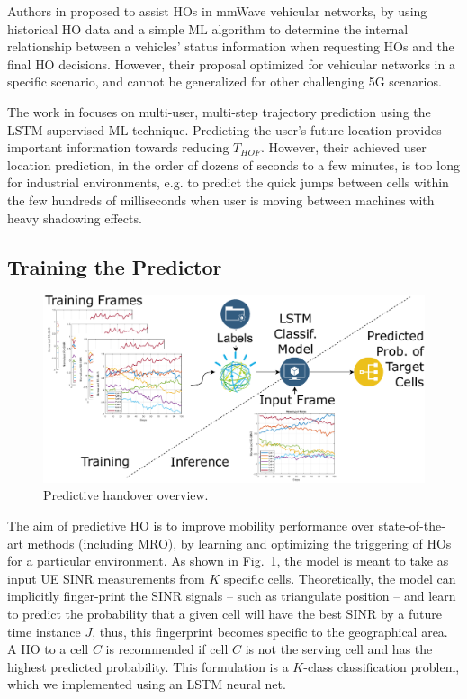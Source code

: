 			Authors in \cite{mlbasedho} proposed to assist \acp{HO} in mmWave vehicular networks, by using historical \ac{HO} data and a simple \ac{ML} algorithm to determine the internal relationship between a vehicles’ status information when requesting \acp{HO} and the final \ac{HO} decisions.
			However, their proposal optimized for vehicular networks in a specific scenario, and cannot be generalized for other challenging 5G scenarios.
			
			The work in \cite{exploringtrajectory} focuses on multi-user, multi-step trajectory prediction using the \ac{LSTM} supervised \ac{ML} technique.
			Predicting the user’s future location provides important information towards reducing $T_{HOF}$.
			However, their achieved user location prediction, in the order of dozens of seconds to a few minutes, is too long for industrial environments, e.g. to predict the quick jumps between cells within the few hundreds of milliseconds when user is moving between machines with heavy shadowing effects.
		
		\subsection{Training the Predictor}
		
			\begin{figure}[ht]
				\centering
				\includegraphics[width=0.64\linewidth]{figures/09_pred_ho/pred_ho_concept/pred_ho_concept.pdf}
				\caption[Predictive handover overview]{Predictive handover overview.}
				\label{fig:pred_ho_concept}
			\end{figure}
			
			The aim of predictive \ac{HO} is to improve mobility performance over state-of-the-art methods (including \ac{MRO}), by learning and optimizing the triggering of \acp{HO} for a particular environment. 
			As shown in Fig.~\ref{fig:pred_ho_concept}, the model is meant to take as input \ac{UE} \ac{SINR} measurements from $K$ specific cells. 
			Theoretically, the model can implicitly finger-print the \ac{SINR} signals -- such as triangulate position -- and learn to predict the probability that a given cell will have the best \ac{SINR} by a future time instance $J$, thus, this fingerprint becomes specific to the geographical area. 
			A \ac{HO} to a cell $C$ is recommended if cell $C$ is not the serving cell and has the highest predicted probability.
			This formulation is a $K$-class classification problem, which we implemented using an \ac{LSTM} neural net.
			
